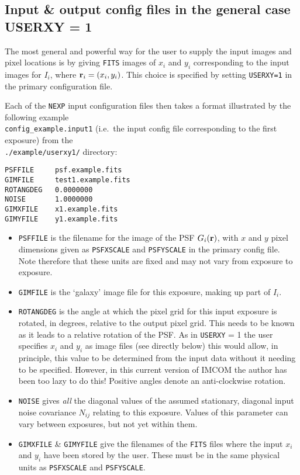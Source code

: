 \documentclass[10pt]{article}
\begin{document}
\subsection{Input \& output config files in the general case USERXY = 1}\label{sect:userxy1}
The most general and powerful way for the user to supply the input images and pixel locations is by giving \texttt{FITS} images of $x_i$ and $y_i$ corresponding to the input images for $I_i$, where ${\bf r}_i = (x_i, y_i)$. This choice is specified by setting \texttt{USERXY=1} in the primary configuration file.

Each of the \texttt{NEXP} input configuration files then takes a format illustrated by the following example \\
\texttt{config\_example.input1} (i.e.\ the input config file corresponding to the first exposure) from the \\
\texttt{./example/userxy1/} directory:

\texttt{PSFFILE~~~~~psf.example.fits \\
GIMFILE~~~~~test1.example.fits \\
ROTANGDEG~~~0.0000000\\
NOISE~~~~~~~1.0000000\\
GIMXFILE~~~~x1.example.fits\\
GIMYFILE~~~~y1.example.fits}
\begin{itemize}
\item \texttt{PSFFILE} is the filename for the image of the PSF $G_i({\bf r})$, with $x$ and $y$ pixel dimensions given as \texttt{PSFXSCALE} and \texttt{PSFYSCALE} in the primary config file.  Note therefore that these units are fixed and may not vary from exposure to exposure.
\item \texttt{GIMFILE} is the `galaxy'  image file for this exposure, making up part of $I_i$.
\item \texttt{ROTANGDEG} is the angle at which the pixel grid for this input exposure is rotated, in degrees, relative to the output pixel grid. This needs to be known as it leads to a relative rotation of the PSF. As in \texttt{USERXY} = 1 the user specifies $x_i$ and $y_i$ as image files (see directly below) this would allow, in principle, this value to be determined from the input data without it needing to be specified. However, in this current version of IMCOM the author has been too lazy to do this!  Positive angles denote an anti-clockwise rotation.
\item \texttt{NOISE} gives \emph{all} the diagonal values of the assumed stationary, diagonal input noise covariance $N_{ij}$ relating to this exposure.  Values of this parameter can vary between exposures, but not yet within them.
\item \texttt{GIMXFILE} \& \texttt{GIMYFILE} give the filenames of the \texttt{FITS} files where the input $x_i$ and $y_i$ have been stored by the user. These must be in the same physical units as \texttt{PSFXSCALE} and \texttt{PSFYSCALE}.
\end{itemize}
\end{document}
